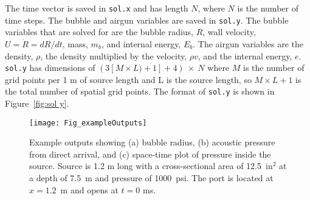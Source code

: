 \documentclass[10pt]{article}
\begin{document}
The time vector is saved in \texttt{sol.x} and has length $N$, where $N$ is the number of time steps. The bubble and airgun variables are saved in \texttt{sol.y}. The bubble variables that are solved for are the bubble radius, $R$, wall velocity, $U = \dot{R} = dR/dt$, mass, $m_b$, and internal energy, $E_b$. The airgun variables are the density, $\rho$, the density multiplied by the velocity, $\rho v$, and the internal energy, $e$. \texttt{sol.y} has dimensions of $(3[M \times L)+1] + 4)~\times~N$ where $M$ is the number of grid points per 1 m of source length and L is the source length, so $M\times L+1$ is the total number of spatial grid points. The format of \texttt{sol.y} is shown in Figure~\ref{fig:sol y}.

\begin{figure}[h]
\centering
\texttt{[image: Fig\_exampleOutputs]}
\caption{Example outputs showing (a) bubble radius, (b) acoustic pressure from direct arrival, and (c) space-time plot of pressure inside the source. Source is 1.2 m long with a cross-sectional area of 12.5~in$^2$ at a depth of 7.5~m and pressure of 1000~psi. The port is located at $x=1.2$~m and opens at $t=0$ ms.}
\label{fig:example outputs}
\end{figure}

\newpage


\end{document}
